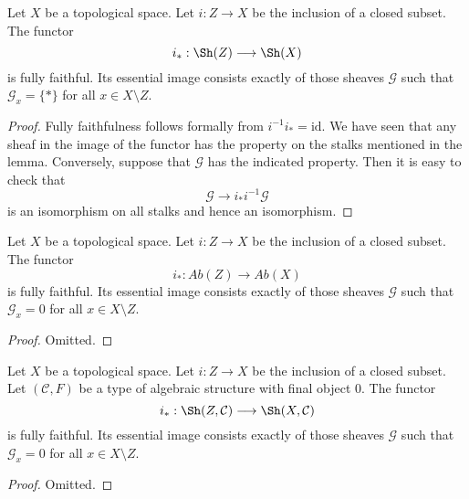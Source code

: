 \begin{lemma}
\label{lemma-equivalence-categories-closed}
Let $X$ be a topological space.
Let $i : Z \to X$ be the inclusion of a closed subset.
The functor
$$
i_* : \Sh(Z) \longrightarrow \Sh(X)
$$
is fully faithful. Its essential image consists exactly
of those sheaves $\mathcal{G}$ such that
$\mathcal{G}_x = \{*\}$ for all $x \in X \setminus Z$.
\end{lemma}

\begin{proof}
Fully faithfulness follows formally from $i^{-1} i_* = \text{id}$.
We have seen that any sheaf in the image of the functor has
the property on the stalks mentioned in the lemma. Conversely, suppose
that $\mathcal{G}$ has the indicated property.
Then it is easy to check that
$$
\mathcal{G} \to i_* i^{-1} \mathcal{G}
$$
is an isomorphism on all stalks and hence an isomorphism.
\end{proof}

\begin{lemma}
\label{lemma-equivalence-categories-closed-abelian}
Let $X$ be a topological space.
Let $i : Z \to X$ be the inclusion of a closed subset.
The functor
$$
i_* : \textit{Ab}(Z) \longrightarrow \textit{Ab}(X)
$$
is fully faithful. Its essential image consists exactly
of those sheaves $\mathcal{G}$ such that
$\mathcal{G}_x = 0$ for all $x \in X \setminus Z$.
\end{lemma}

\begin{proof}
Omitted.
\end{proof}

\begin{lemma}
\label{lemma-equivalence-categories-closed-structures}
Let $X$ be a topological space.
Let $i : Z \to X$ be the inclusion of a closed subset.
Let $(\mathcal{C}, F)$ be a type of algebraic structure
with final object $0$. The functor
$$
i_* : \Sh(Z, \mathcal{C}) \longrightarrow \Sh(X, \mathcal{C})
$$
is fully faithful. Its essential image consists exactly
of those sheaves $\mathcal{G}$ such that
$\mathcal{G}_x = 0$ for all $x \in X \setminus Z$.
\end{lemma}

\begin{proof}
Omitted.
\end{proof}

